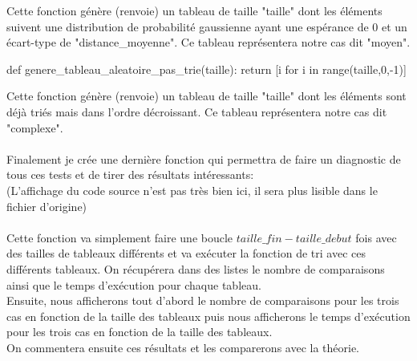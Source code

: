 \documentclass[a4paper,12pt]{article}
\begin{document}
Cette fonction génère (renvoie) un tableau de taille "taille" dont les éléments suivent une distribution de probabilité gaussienne ayant une espérance de 0 et un écart-type de "distance\_moyenne". Ce tableau représentera notre cas dit "moyen".
\begin{python}
  def genere_tableau_aleatoire_pas_trie(taille):
    return [i for i in range(taille,0,-1)]
\end{python}
Cette fonction génère (renvoie) un tableau de taille "taille" dont les éléments sont déjà triés mais dans l'ordre décroissant. Ce tableau représentera notre cas dit "complexe". \\ \\
Finalement je crée une dernière fonction qui permettra de faire un diagnostic de tous ces tests et de tirer des résultats intéressants: \\
(L'affichage du code source n'est pas très bien ici, il sera plus lisible dans le fichier d'origine) \\ \\
Cette fonction va simplement faire une boucle $taille\_fin - taille\_debut$ fois avec des tailles de tableaux différents et va exécuter la fonction de tri avec ces différents tableaux. On récupérera dans des listes le nombre de comparaisons ainsi que le temps d'exécution pour chaque tableau.\\
Ensuite, nous afficherons tout d'abord le nombre de comparaisons pour les trois cas en fonction de la taille des tableaux puis nous afficherons le temps d'exécution pour les trois cas en fonction de la taille des tableaux. \\
On commentera ensuite ces résultats et les comparerons avec la théorie.
\end{document}
